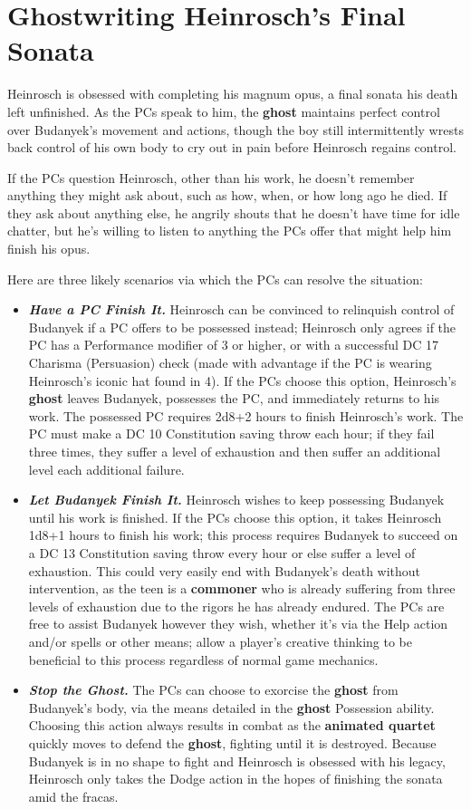 \documentclass[10pt,a4paper,twoside,bg=print,twocolumn,openany,nodeprecatedcode]{dndbook}
\begin{document}
\section{Ghostwriting Heinrosch's Final Sonata}
Heinrosch is obsessed with completing his magnum opus, a final sonata his death left unfinished. As the PCs speak to him, the \textbf{ghost} maintains perfect control over Budanyek's movement and actions, though the boy still intermittently wrests back control of his own body to cry out in pain before Heinrosch regains control.

If the PCs question Heinrosch, other than his work, he doesn't remember anything they might ask about, such as how, when, or how long ago he died. If they ask about anything else, he angrily shouts that he doesn't have time for idle chatter, but he's willing to listen to anything the PCs offer that might help him finish his opus.

Here are three likely scenarios via which the PCs can resolve the situation:


\begin{itemize}
\item \textbf{\textit{Have a PC Finish It.}} Heinrosch can be convinced to relinquish control of Budanyek if a PC offers to be possessed instead; Heinrosch only agrees if the PC has a Performance modifier of 3 or higher, or with a successful DC 17 Charisma (Persuasion) check (made with advantage if the PC is wearing Heinrosch's iconic hat found in 4). If the PCs choose this option, Heinrosch's \textbf{ghost} leaves Budanyek, possesses the PC, and immediately returns to his work. The possessed PC requires 2d8+2 hours to finish Heinrosch's work. The PC must make a DC 10 Constitution saving throw each hour; if they fail three times, they suffer a level of exhaustion and then suffer an additional level each additional failure.
\item \textbf{\textit{Let Budanyek Finish It.}} Heinrosch wishes to keep possessing Budanyek until his work is finished. If the PCs choose this option, it takes Heinrosch 1d8+1 hours to finish his work; this process requires Budanyek to succeed on a DC 13 Constitution saving throw every hour or else suffer a level of exhaustion. This could very easily end with Budanyek's death without intervention, as the teen is a \textbf{commoner} who is already suffering from three levels of exhaustion due to the rigors he has already endured. The PCs are free to assist Budanyek however they wish, whether it's via the Help action and/or spells or other means; allow a player's creative thinking to be beneficial to this process regardless of normal game mechanics.
\item \textbf{\textit{Stop the Ghost.}} The PCs can choose to exorcise the \textbf{ghost} from Budanyek's body, via the means detailed in the \textbf{ghost} Possession ability. Choosing this action always results in combat as the \textbf{animated quartet} quickly moves to defend the \textbf{ghost}, fighting until it is destroyed. Because Budanyek is in no shape to fight and Heinrosch is obsessed with his legacy, Heinrosch only takes the Dodge action in the hopes of finishing the sonata amid the fracas.
\end{itemize}
\end{document}
